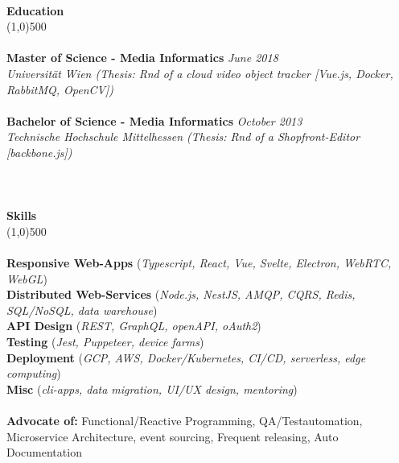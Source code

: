 \documentclass[9pt]{extarticle}
\begin{document}
\noindent
\noindent %
\\
{\Large \bf Education}\\
\line(1,0){500}\\
\\
\noindent
{\bf Master of Science - Media Informatics} \hfill \textit{June 2018} \\ 
\textit{Universität Wien (Thesis: Rnd of a cloud video object tracker [Vue.js, Docker, RabbitMQ, OpenCV])}\\\\
\noindent
{\bf Bachelor of Science - Media Informatics} \hfill \textit{October 2013} \\
\textit{Technische Hochschule Mittelhessen (Thesis: Rnd of a Shopfront-Editor [backbone.js])}\\
\\
\\\\
{\Large \bf Skills}\\
\line(1,0){500}\\
\\
\noindent
{\small
{\bf Responsive Web-Apps } (\textit{Typescript, React, Vue, Svelte, Electron, WebRTC, WebGL}) \\
{\bf Distributed Web-Services } (\textit{Node.js, NestJS, AMQP, CQRS, Redis, SQL/NoSQL, data warehouse}) \\
{\bf API Design }(\textit{REST, GraphQL, openAPI, oAuth2}) \\
{\bf Testing }(\textit{Jest, Puppeteer, device farms}) \\
{\bf Deployment }(\textit{GCP, AWS, Docker/Kubernetes, CI/CD, serverless, edge computing}) \\
{\bf Misc }(\textit{cli-apps, data migration, UI/UX design, mentoring}) \\\\
\noindent
{\bf Advocate of:} Functional/Reactive Programming, QA/Testautomation, Microservice Architecture, event sourcing, Frequent releasing, Auto Documentation 
}
\end{document}
